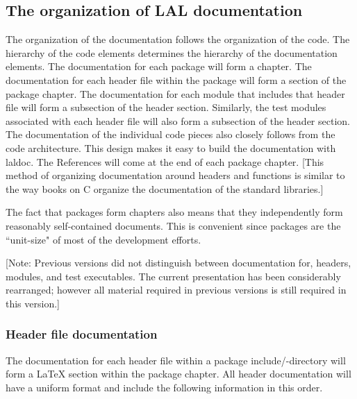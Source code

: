 \documentclass[]{ligodcc}
\begin{document}
\subsection{The organization of LAL documentation}
The organization  of  the documentation follows the organization of
the code. The hierarchy of the code elements determines the hierarchy
of the documentation elements. The documentation for each package will
form a chapter. The documentation for each  header file within the
package will form a section of the package chapter. The documentation
for each module that includes that header file will form a subsection
of the header section. Similarly, the test modules associated with
each header file will also form a subsection of the header section.
The  documentation of the individual code pieces also closely follows
from the code architecture.  This design makes it easy to build the
documentation with laldoc. The References will come at the end of each
package chapter. [This method of organizing documentation around
headers and functions is similar to  the way books on C organize the
documentation of  the standard libraries.]

The fact that packages form chapters also means that they
independently form reasonably self-contained documents.  This is
convenient since packages  are the ``unit-size" of  most of the
development efforts. 

[Note: Previous versions did not distinguish between documentation
for, headers, modules, and test executables. The current presentation
has been considerably rearranged; however all material required in
previous versions is still required in this version.]

\subsubsection{Header file documentation}

The documentation for each header file within a package
include/-directory will form a LaTeX section within the package
chapter. All header  documentation will have a uniform format and
include the following information in this order.  
\end{document}
